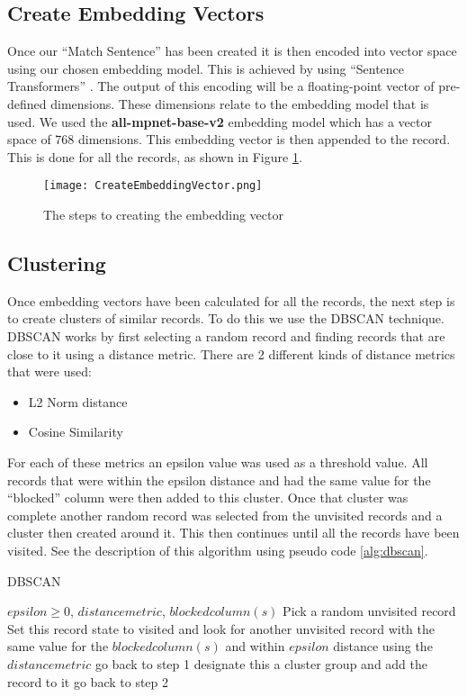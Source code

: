 \documentclass{article}
\begin{document}
\subsection{Create Embedding Vectors}
Once our “Match Sentence” has been created it is then encoded into vector space using our chosen embedding model. This is achieved by using “Sentence Transformers” \cite{sentence-transformers}. The output of this encoding will be a floating-point vector of pre-defined dimensions. These dimensions relate to the embedding model that is used. We used the \textbf{all-mpnet-base-v2}\cite{allmpnetbasev2} embedding model which has a vector space of 768 dimensions. This embedding vector is then appended to the record. This is done for all the records, as shown in Figure \ref{fig:create-embedding-vector}.

\begin{figure}[h]
\texttt{[image: CreateEmbeddingVector.png]}
\caption{The steps to creating the embedding vector}
\label{fig:create-embedding-vector}
\end{figure} %

\subsection{Clustering}
Once embedding vectors have been calculated for all the records, the next step is to create clusters of similar records. To do this we use the DBSCAN technique.
DBSCAN works by first selecting a random record and finding records that are close to it using a distance metric. There are 2 different kinds of distance metrics that were used:

\begin{itemize}
\item L2 Norm distance
\item Cosine Similarity
\end{itemize}

For each of these metrics an epsilon value was used as a threshold value. All records that were within the epsilon distance and had the same value for the “blocked” column were then added to this cluster.
Once that cluster was complete another random record was selected from the unvisited records and a cluster then created around it. This then continues until all the records have been visited.
See the description of this algorithm using pseudo code \ref{alg:dbscan}.

\begin{algorithm}
\caption{DBSCAN}\label{alg:dbscan}
\begin{algorithmic}[1]
\Require $epsilon \geq 0$, $distancemetric$, $blockedcolumn(s)$
\State Pick a random unvisited record
\State Set this record state to visited and look for another unvisited record with the same value for the $blockedcolumn(s)$ and within $epsilon$ distance using the $distancemetric$
    \State go back to step 1
\Else
    \State designate this a cluster group and add the record to it
    \State go back to step 2
\EndIf
\end{algorithmic}
\end{algorithm}
\end{document}
